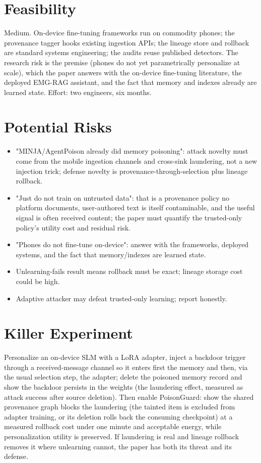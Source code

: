 \documentclass[11pt]{article}
\begin{document}
\section{Feasibility}
Medium. On-device fine-tuning frameworks run on commodity phones; the provenance tagger hooks existing ingestion APIs; the lineage store and rollback are standard systems engineering; the audits reuse published detectors. The research risk is the premise (phones do not yet parametrically personalize at scale), which the paper answers with the on-device fine-tuning literature, the deployed EMG-RAG assistant, and the fact that memory and indexes already are learned state. Effort: two engineers, six months.

\section{Potential Risks}
\begin{itemize}
  \item "MINJA/AgentPoison already did memory poisoning": attack novelty must come from the mobile ingestion channels and cross-sink laundering, not a new injection trick; defense novelty is provenance-through-selection plus lineage rollback.
  \item "Just do not train on untrusted data": that is a provenance policy no platform documents, user-authored text is itself contaminable, and the useful signal is often received content; the paper must quantify the trusted-only policy's utility cost and residual risk.
  \item "Phones do not fine-tune on-device": answer with the frameworks, deployed systems, and the fact that memory/indexes are learned state.
  \item Unlearning-fails result means rollback must be exact; lineage storage cost could be high.
  \item Adaptive attacker may defeat trusted-only learning; report honestly.
\end{itemize}

\section{Killer Experiment}
Personalize an on-device SLM with a LoRA adapter, inject a backdoor trigger through a received-message channel so it enters first the memory and then, via the usual selection step, the adapter; delete the poisoned memory record and show the backdoor persists in the weights (the laundering effect, measured as attack success after source deletion). Then enable PoisonGuard: show the shared provenance graph blocks the laundering (the tainted item is excluded from adapter training, or its deletion rolls back the consuming checkpoint) at a measured rollback cost under one minute and acceptable energy, while personalization utility is preserved. If laundering is real and lineage rollback removes it where unlearning cannot, the paper has both its threat and its defense.
\end{document}
